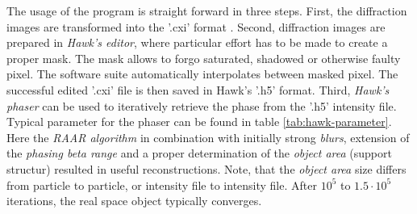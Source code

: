 The usage of the program is straight forward in three steps. First, the diffraction images are transformed into the '.cxi' format \citep{Maia-2012-NatMet}. Second, diffraction images are prepared in \textit{Hawk's editor}, where particular effort has to be made to create a proper mask. The mask  allows to forgo saturated, shadowed or otherwise faulty pixel. The software suite automatically interpolates between masked pixel. The successful edited '.cxi' file is then saved in Hawk's '.h5' format. Third, \textit{Hawk's phaser} can be used to iteratively retrieve the phase from the '.h5' intensity file. Typical parameter for the phaser can be found in table \ref{tab:hawk-parameter}. Here the \textit{RAAR algorithm} \cite{Luke-2005-IP} in combination with initially strong \textit{blurs}, extension of the \textit{phasing beta range} and a proper determination of the \textit{object area} (support structur) resulted in useful reconstructions. Note, that the \textit{object area} size differs from particle to particle, or intensity file to intensity file. After $10^{5}$ to $1.5\cdot 10^{5}$ iterations, the real space object typically converges.
%
%
%
